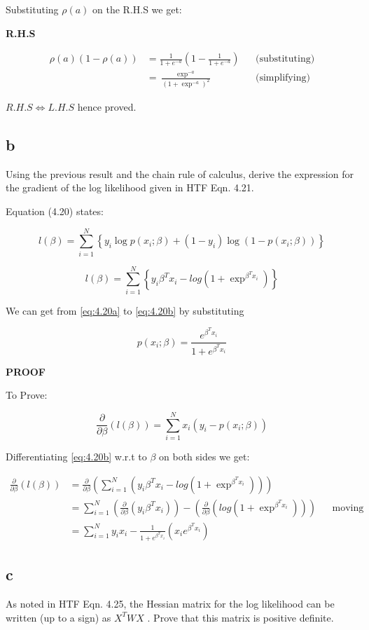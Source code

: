 \documentclass[12pt]{article}
\newcommand{\pderiv}[2]{\frac{\partial}{\partial #1} (#2)}
\begin{document}
Substituting $\rho(a)$ on the R.H.S we get:

\textbf{R.H.S}

        \begin{align*}
            \rho(a)(1 - \rho(a)) &= \frac{1}{1+e^{-a}} \left( 1-\frac{1}{1+e^{-a}} \right)
                                 && \text{(substituting)}\\
                                 &= \frac{\exp^{-a}}{(1 + \exp^{-a})^2} && \text{(simplifying)}
        \end{align*}

$R.H.S \iff L.H.S$ hence proved.

\pagebreak

\subsection{b} 

Using the previous result and the chain rule of calculus, derive the expression for the gradient
of the log likelihood given in HTF Eqn. 4.21.

Equation (4.20) states:

\begin{equation} \label{eq:4.20a}
l(\beta) = \displaystyle\sum_{i=1}^{N} \left \{ y_i \log p(x_i;\beta)
+ (1-y_i) \log (1 - p(x_i;\beta)) \right \}
\end{equation}

\begin{equation} \label{eq:4.20b}
l(\beta) = \displaystyle\sum_{i=1}^{N} \left \{ y_i \beta^T x_i 
- log (1 + \exp^{\beta^{T}x_i}) \right\}
\end{equation}

We can get from \eqref{eq:4.20a} to \eqref{eq:4.20b} by substituting 

    \[
        p(x_i;\beta) = \frac{e^{{\beta}^Tx_i}}{1+{e^{{\beta}^Tx_i}}}
    \]

\textbf{PROOF}

    To Prove:

    \[
        \pderiv{\beta}{l(\beta)} = \displaystyle\sum_{i=1}^{N} x_i(y_i-p(x_i;\beta))
    \]

    Differentiating \eqref{eq:4.20b} w.r.t to $\beta$ on both sides we get:
    
    \begin{align*}
        \pderiv{\beta}{l(\beta)}&= \pderiv{\beta}{
                                \displaystyle\sum_{i=1}^{N}(y_i\beta^Tx_i -log(1 + \exp^{\beta^{T}x_i}))}\\
                                &=\displaystyle\sum_{i=1}^{N} (\pderiv{\beta}{y_i\beta^Tx_i}) -
                                (\pderiv{\beta}{log(1 + \exp^{\beta^{T}x_i}))} && \text{moving derivative inside}\\
                                &=\displaystyle\sum_{i=1}^{N}y_ix_i -\frac{1}{1 + e^{\beta^{T}x_i}}(x_i e^{\beta^{T}x_i})
    \end{align*}

\subsection{c} 

As noted in HTF Eqn. 4.25, the Hessian matrix for the log likelihood can be written 
(up to a sign) as $X^TWX$ . Prove that this matrix is positive definite.
\end{document}
